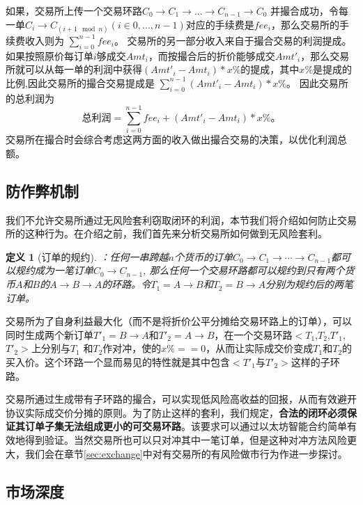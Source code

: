 \documentclass[UTF8,nofonts]{ctexart}
\newtheorem{definition}{定义}[section]
\begin{document}
如果，交易所上传一个交易环路$C_0 \rightarrow C_1 \rightarrow ... \rightarrow C_{n-1} \rightarrow C_{0}$ 并撮合成功，令每一单$C_{i}\rightarrow C_{(i+1\mod n)}$$(i\in{0,...,n-1})$对应的手续费是$fee_{i}$，那么交易所的手续费收入则为
$
\sum^{n-1}_{i=0}fee_{i}\text{。}
$
交易所的另一部分收入来自于撮合交易的利润提成。如果按照原价每订单$i$够成交$Amt_{i}$，而按撮合后的折价能够成交$Amt'_{i}$，那么交易所就可以从每一单的利润中获得$(Amt'_{i}-Amt_{i})*x\%$的提成，其中$x\%$是提成的比例,因此交易所的撮合交易提成是
$
\sum^{n-1}_{i=0}(Amt'_{i}-Amt_{i})*x\%\text{。}
$
因此交易所的总利润为
$$
\text{总利润} = \sum^{n-1}_{i=0}fee_{i}+(Amt'_{i}-Amt_{i})*x\%\text{。}
$$
交易所在撮合时会综合考虑这两方面的收入做出撮合交易的决策，以优化利润总额。

\subsection{防作弊机制}
我们不允许交易所通过无风险套利窃取闭环的利润，本节我们将介绍如何防止交易所的这种行为。在介绍之前，我们首先来分析交易所如何做到无风险套利。
\begin{definition}[订单的规约]：任何一串跨越$n$个货币的订单$C_{0}\rightarrow C_{1}\rightarrow \cdots \rightarrow C_{n-1}$都可以规约成为一笔订单$C_{0} \rightarrow C_{n-1}$, 那么任何一个交易环路都可以规约到只有两个货币$A$和$B$的$A\rightarrow B\rightarrow A$的环路。令$T_{1} = A\rightarrow B$和$T_{2} = B\rightarrow A$分别为规约后的两笔订单。
\end{definition}

交易所为了自身利益最大化（而不是将折价公平分摊给交易环路上的订单），可以同时生成两个新订单$T'_{1} = B\rightarrow A$和$T'_{2} = A\rightarrow B$，在一个交易环路$<T_{1}$,$T_{2}$,$T'_{1}$,$T'_{2}>$上分别与$T_{1}$ 和$T_{2}$作对冲，使的$x\%==0$，从而让实际成交价变成$T_{1}$和$T_{2}$的买入价。这个环路一个显而易见的特性就是其中包含$<T'_{1}$与$T'_{2}>$这样的子环路。

交易所通过生成带有子环路的撮合，可以实现低风险高收益的回报，从而有效避开协议实际成交价分摊的原则。为了防止这样的套利，我们规定，{\bfseries 合法的闭环必须保证其订单子集无法组成更小的可交易环路}。该要求可以通过以太坊智能合约简单有效地得到验证。当然交易所也可以只对冲其中一笔订单，但是这种对冲方法风险更大，我们会在章节\ref{sec:exchange}中对有交易所的有风险做市行为作进一步探讨。

\subsection{市场深度\label{sec:marketdepth}}
\end{document}
